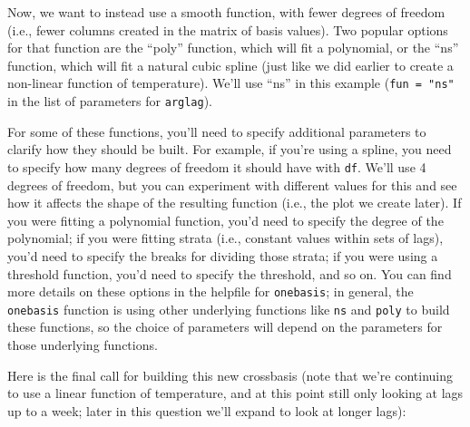 \documentclass[
]{book}
\newenvironment{Shaded}{\begin{snugshade}}{\end{snugshade}}
\newcommand{\AttributeTok}[1]{\textcolor[rgb]{0.13,0.29,0.53}{#1}}
\newcommand{\DecValTok}[1]{\textcolor[rgb]{0.00,0.00,0.81}{#1}}
\newcommand{\FunctionTok}[1]{\textcolor[rgb]{0.13,0.29,0.53}{\textbf{#1}}}
\newcommand{\NormalTok}[1]{#1}
\newcommand{\OtherTok}[1]{\textcolor[rgb]{0.56,0.35,0.01}{#1}}
\newcommand{\SpecialCharTok}[1]{\textcolor[rgb]{0.81,0.36,0.00}{\textbf{#1}}}
\newcommand{\StringTok}[1]{\textcolor[rgb]{0.31,0.60,0.02}{#1}}
\begin{document}
Now, we want to instead use a smooth function, with fewer degrees of freedom (i.e., fewer
columns created in the matrix of basis values). Two popular options for that function are
the ``poly'' function, which will fit a polynomial, or the ``ns'' function, which will fit
a natural cubic spline (just like we did earlier to create a non-linear function of
temperature). We'll use ``ns'' in this example (\texttt{fun\ =\ "ns"} in the list of parameters for
\texttt{arglag}).

For some of these functions, you'll need to specify additional parameters to clarify
how they should be built. For example, if you're using a spline, you need to specify
how many degrees of freedom it should have with \texttt{df}. We'll use 4 degrees of freedom,
but you can experiment with different values for this and see how it affects the shape
of the resulting function (i.e., the plot we create later). If you were fitting a
polynomial function,
you'd need to specify the degree of the polynomial; if you were fitting strata (i.e.,
constant values within sets of lags), you'd need to specify the breaks for dividing
those strata; if you were using a threshold function, you'd need to specify the threshold,
and so on. You can find more details on these options in the helpfile for \texttt{onebasis};
in general, the \texttt{onebasis} function is using other underlying functions like \texttt{ns} and
\texttt{poly} to build these functions, so the choice of parameters will depend on the parameters
for those underlying functions.

Here is the final call for building this new crossbasis (note that we're continuing to
use a linear function of temperature, and at this point still only looking at lags up to
a week; later in this question we'll expand to look at longer lags):

\begin{Shaded}
\end{Shaded}
\end{document}
